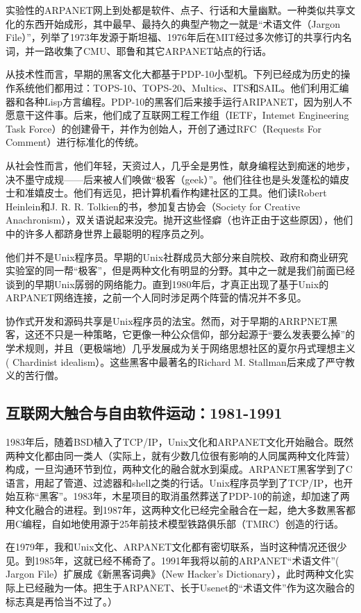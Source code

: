 \documentclass[12pt,oneside]{book}
\begin{document}
\begin{common-format}
实验性的ARPANET网上到处都是软件、点子、行话和大量幽默。一种类似共享文化的东西开始成形，其中最早、最持久的典型产物之一就是“术语文件（Jargon File）”，列举了1973年发源于斯坦福、1976年后在MIT经过多次修订的共享行内名词，并一路收集了CMU、耶鲁和其它ARPANET站点的行话。

从技术性而言，早期的黑客文化大都基于PDP-10小型机。下列已经成为历史的操作系统他们都用过：TOPS-10、TOPS-20、Multics、ITS和SAIL。他们利用汇编器和各种Lisp方言编程。PDP-10的黑客们后来接手运行ARIPANET，因为别人不愿意干这件事。后来，他们成了互联网工程工作组（IETF，Intemet Engineering Task Force）的创建骨干，并作为创始人，开创了通过RFC（Requests For Comment）进行标准化的传统。

从社会性而言，他们年轻，天资过人，几乎全是男性，献身编程达到痴迷的地步，决不墨守成规——后来被人们唤做“极客（geek）”。他们往往也是头发蓬松的嬉皮士和准嬉皮士。他们有远见，把计算机看作构建社区的工具。他们读Robert Heinlein和J. R. R. Tolkien的书，参加复古协会（Society for Creative Anachronism），双关语说起来没完。抛开这些怪癖（也许正由于这些原因），他们中的许多人都跻身世界上最聪明的程序员之列。

他们并不是Unix程序员。早期的Unix社群成员大部分来自院校、政府和商业研究实验室的同一帮“极客”，但是两种文化有明显的分野。其中之一就是我们前面已经谈到的早期Unix孱弱的网络能力。直到1980年后，才真正出现了基于Unix的ARPANET网络连接，之前一个人同时涉足两个阵营的情况并不多见。

协作式开发和源码共享是Unix程序员的法宝。然而，对于早期的ARRPNET黑客，这还不只是一种策略，它更像一种公众信仰，部分起源于“要么发表要么掉”的学术规则，并且（更极端地）几乎发展成为关于网络思想社区的夏尔丹式理想主义( Chardinist idealism）。这些黑客中最著名的Richard M. Stallman后来成了严守教义的苦行僧。

\subsection{互联网大触合与自由软件运动：1981-1991}
1983年后，随着BSD植入了TCP/IP，Unix文化和ARPANET文化开始融合。既然两种文化都由同一类人（实际上，就有少数几位很有影响的人同属两种文化阵营）构成，一旦沟通环节到位，两种文化的融合就水到渠成。ARPANET黑客学到了C语言，用起了管道、过滤器和shell之类的行话。Unix程序员学到了TCP/IP，也开始互称“黑客”。1983年，木星项目的取消虽然葬送了PDP-10的前途，却加速了两种文化融合的进程。到1987年，这两种文化已经完全融合在一起，绝大多数黑客都用C编程，自如地使用源于25年前技术模型铁路俱乐部（TMRC）创造的行话。

在1979年，我和Unix文化、ARPANET文化都有密切联系，当时这种情况还很少见。到1985年，这就已经不稀奇了。1991年我将以前的ARPANET“术语文件”( Jargon File）扩展成《新黑客词典》（New Hacker's Dictionary）\cite{Raymond96}，此时两种文化实际上已经融为一体。把生于ARPANET、长于Usenet的“术语文件”作为这次融合的标志真是再恰当不过了。）


\end{common-format}
\end{document}
